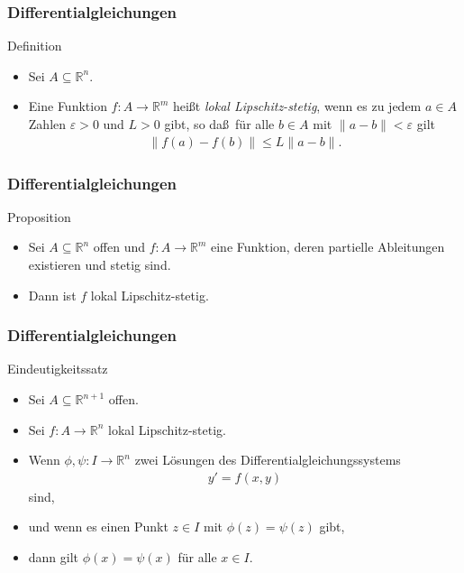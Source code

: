 \documentclass{beamer}
\renewcommand{\emph}[1]{{\textcolor{solarizedRed}{\itshape #1}}}
\newcommand\RR{\mathbb R}
\newcommand{\eps}{\varepsilon}
\renewcommand{\oe}{\"o}
\newcommand{\ue}{\"u}
\newcommand{\mytitle}{Differentialgleichungen}
\begin{document}
\begin{frame}\frametitle{\mytitle}
	\begin{block}{Definition}
		\begin{itemize}
			\item Sei $A\subseteq\RR^n$.
			\item Eine Funktion $f:A\to\RR^m$ hei\ss t \emph{lokal Lipschitz-stetig}, wenn es zu jedem $a\in A$ Zahlen $\eps>0$ und $L>0$ gibt, so da\ss\ f\ue r alle $b\in A$ mit $\|a-b\|<\eps$ gilt
				\begin{align*}
					\|f(a)-f(b)\|\leq L\|a-b\|.
				\end{align*}
		\end{itemize}
	\end{block}
\end{frame}

\begin{frame}\frametitle{\mytitle}
	\begin{block}{Proposition}
		\begin{itemize}
			\item Sei $A\subseteq\RR^n$ offen und $f:A\to\RR^m$ eine Funktion, deren partielle Ableitungen existieren und stetig sind.
			\item Dann ist $f$ lokal Lipschitz-stetig.
		\end{itemize}
	\end{block}
\end{frame}

\begin{frame}\frametitle{\mytitle}
	\begin{block}{Eindeutigkeitssatz}
		\begin{itemize}
			\item Sei $A\subseteq\RR^{n+1}$ offen.
			\item Sei $f:A\to\RR^n$ lokal Lipschitz-stetig.
			\item Wenn $\phi,\psi:I\to\RR^n$ zwei L\oe sungen des Differentialgleichungssystems
				\begin{align*}
					y'=f(x,y)
				\end{align*}
				sind,
			\item und wenn es einen Punkt $z\in I$ mit $\phi(z)=\psi(z)$ gibt,
			\item dann gilt $\phi(x)=\psi(x)$ f\ue r alle $x\in I$.
		\end{itemize}
	\end{block}
\end{frame}
\end{document}
